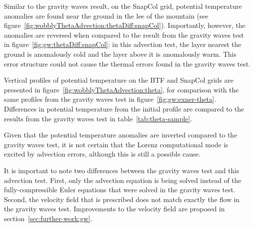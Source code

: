 Similar to the gravity waves result, on the SnapCol grid, potential temperature anomalies are found near the ground in the lee of the mountain (see figure~\ref{fig:wobblyThetaAdvection:thetaDiff:snapCol}).  Importantly, however, the anomalies are reversed when compared to the result from the gravity waves test in figure~\ref{fig:gw:thetaDiff:snapCol}: in this advection test, the layer nearest the ground is anomalously cold and the layer above it is anomalously warm.  This error structure could not cause the thermal errors found in the gravity waves test.

Vertical profiles of potential temperature on the BTF and SnapCol grids are presented in figure~\ref{fig:wobblyThetaAdvection:theta}, for comparison with the same profiles from the gravity waves test in figure~\ref{fig:gw:exner-theta}.
Differences in potential temperature from the initial profile are compared to the results from the gravity waves test in table~\ref{tab:theta-sample}.

Given that the potential temperature anomalies are inverted compared to the gravity waves test, it is not certain that the Lorenz computational mode is excited by advection errors, although this is still a possible cause.

It is important to note two differences between the gravity waves test and this advection test.  First, only the advection equation is being solved instead of the fully-compressible Euler equations that were solved in the gravity waves test.  Second, the velocity field that is prescribed does not match exactly the flow in the gravity waves test.  Improvements to the velocity field are proposed in section~\ref{sec:further-work:gw}.

